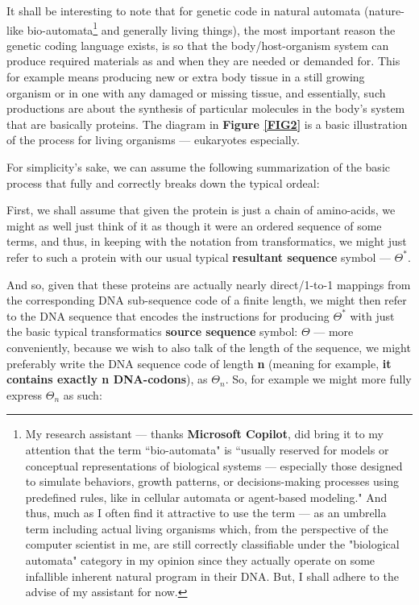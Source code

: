 \documentclass[a4paper, 18pt]{article} %
\begin{document}
    
It shall be interesting to note that for genetic code in natural automata (nature-like bio-automata\footnote{My research assistant --- thanks \textbf{Microsoft Copilot}, did bring it to my attention that the term ``bio-automata" is ``usually reserved for models or conceptual representations of biological systems --- especially those designed to simulate behaviors, growth patterns, or decisions-making processes using predefined rules, like in cellular automata or agent-based modeling." And thus, much as I often find it attractive to use the term --- as an umbrella term including actual living organisms which, from the perspective of the computer scientist in me, are still correctly classifiable under the "biological automata" category in my opinion since they actually operate on some infallible inherent natural program in their DNA. But, I shall adhere to the advise of my assistant for now.} and generally living things), the most important reason the genetic coding language exists, is so that the body/host-organism system can produce required materials as and when they are needed or demanded for. This for example means producing new or extra body tissue in a still growing organism or in one with any damaged or missing tissue, and essentially, such productions are about the synthesis of particular molecules in the body's system that are basically proteins. The diagram in \textbf{Figure \ref{FIG2}} is a basic illustration of the process for living organisms --- eukaryotes especially.

For simplicity's sake, we can assume the following summarization of the basic process that fully and correctly breaks down the typical ordeal:

First, we shall assume that given the protein is just a chain of amino-acids, we might as well just think of it as though it were an ordered sequence of some terms, and thus, in keeping with the notation from transformatics, we might just refer to such a protein with our usual typical \textbf{resultant sequence} symbol --- $\Theta^*$.

And so, given that these proteins are actually nearly direct/1-to-1 mappings from the corresponding DNA sub-sequence code of a finite length, we might then refer to the DNA sequence that encodes the instructions for producing $\Theta^*$ with just the basic typical transformatics \textbf{source sequence} symbol: $\Theta$ --- more conveniently, because we wish to also talk of the length of the sequence, we might preferably write the DNA sequence code of length \textbf{n} (meaning for example, \textbf{it contains exactly n DNA-codons}), as $\Theta_n$. So, for example we might more fully express $\Theta_n$ as such:
\end{document}

